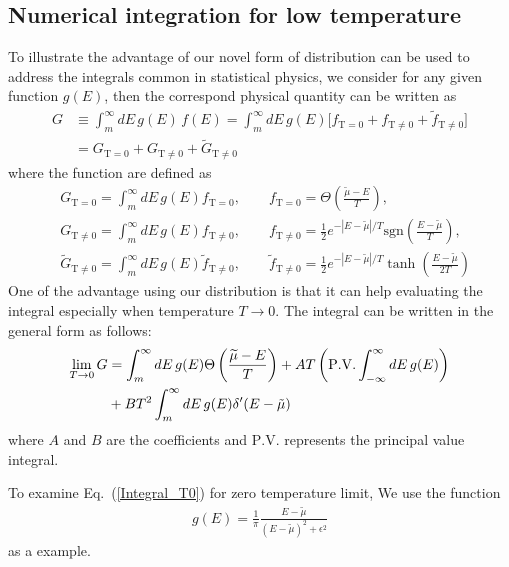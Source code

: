 \documentclass[sn-mathphys,Numbered]{sn-jnl}
\begin{document}
\subsection{Numerical integration for low temperature}
To illustrate the advantage of our novel form of distribution can be used to address the integrals common in statistical physics, we consider for any given function $g(E)$, then the correspond physical quantity can be written as
\begin{align}
G&\equiv\int^{\infty}_{m}dE\,g(E)\,f(E)=\int^{\infty}_{m}dE\,g(E)\bigg[f_{\mathrm{T=0}}+f_\mathrm{T\neq0}+\tilde f_\mathrm{T\neq0}\bigg]\\
&=G_{\mathrm{T=0}}+G_\mathrm{T\neq0}+\tilde G_\mathrm{T\neq0}
\end{align}
where the function are defined as
\begin{align}
&G_{\mathrm{T=0}}=\int^{\infty}_{m}dE\,g(E)f_{\mathrm{T=0}},\qquad f_{\mathrm{T=0}}=\Theta\left(\frac{\widetilde\mu - E}{T}\right),\\ &G_{\mathrm{T\neq0}}=\int^{\infty}_{m}dE\,g(E)f_{\mathrm{T\neq0}},\qquad f_\mathrm{T\neq0}=\frac{1}{2}e^{ - |E-\widetilde\mu|/T }\mathrm{sgn}\left(\frac{E-\widetilde\mu}{T}\right),\\
&\tilde G_{\mathrm{T\neq0}}=\int^{\infty}_{m}dE\,g(E)\tilde f_{\mathrm{T\neq0}},\qquad\tilde f_\mathrm{T\neq0}=\frac{1}{2}e^{ - |E-\widetilde\mu|/T }\tanh\left(\frac{E-\widetilde\mu}{2T}\right)
\end{align}
One of the advantage using our distribution is that it can help evaluating the integral especially when temperature $T\to0$. The integral can be written in the general form as follows:
\begin{align}\label{Integral_T0}
\lim_{T\to0}G&=\int^{\infty}_{m}dE\,g(E)\Theta\left(\frac{\widetilde\mu - E}{T}\right)+A T\left(\mathrm{P.V.} \int^{\infty}_{-\infty}dE\,g(E)\right)\notag\\
&+BT^2\int^{\infty}_{m}dE\,g(E)\delta^{\prime}(E-\tilde\mu)
\end{align}
where $A$ and $B$ are the coefficients and $\mathrm{P.V.}$ represents the principal value integral.

To examine Eq.~(\ref{Integral_T0}) for zero temperature limit, We use the function 
\begin{align}
    g(E)=\frac{1}{\pi} \frac{E-\tilde\mu}{(E-\tilde\mu)^2+\epsilon^2}
\end{align}
as a example. 

\end{document}
